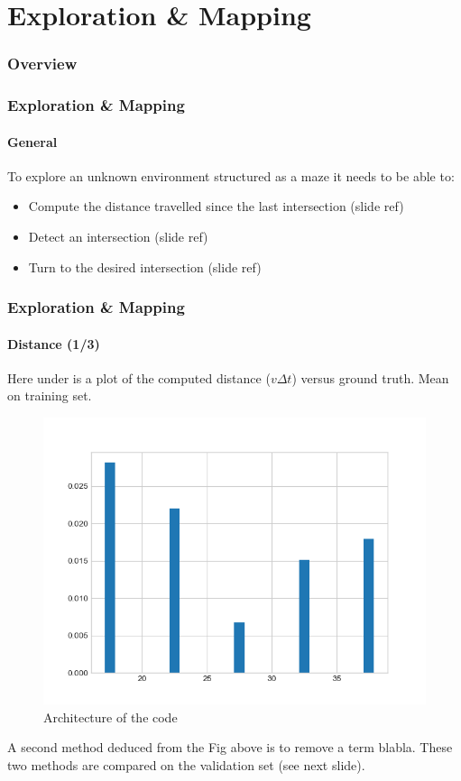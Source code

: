 \documentclass[10pt]{beamer}
\begin{document}
\section{Exploration \& Mapping} 

\begin{frame}
\frametitle{Overview}
\tableofcontents[currentsection,subsectionstyle=shaded]
\end{frame}

\begin{frame}
\frametitle{Exploration \& Mapping}
\framesubtitle{General}
To explore an unknown environment structured as a maze it needs to be able to:
\begin{itemize}
\item Compute the distance travelled since the last intersection (slide ref)
\item Detect an intersection (slide ref)
\item Turn to the desired intersection (slide ref)
\end{itemize}
\end{frame}


\begin{frame}
\frametitle{Exploration \& Mapping}
\framesubtitle{Distance (1/3)}
Here under is a plot of the computed distance ($v\Delta t$) versus ground truth. Mean on training set.
\begin{figure}[hbtp]
\centering
\label{fig:architecture}
\includegraphics[scale=0.45]{figures/hist-distance.png}
\caption{Architecture of the code}
\end{figure}
A second method deduced from the Fig above is to remove a term blabla. These two methods are compared on the validation set (see next slide).
\end{frame}
\end{document}
